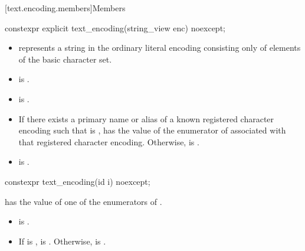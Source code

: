 [text.encoding.members]{Members}

%
\begin{itemdecl}
constexpr explicit text_encoding(string_view enc) noexcept;
\end{itemdecl}

\begin{itemdescr}
\pnum
\expects
\begin{itemize}
\item
{} represents a string in the ordinary literal encoding
consisting only of elements of the basic character set.
\item
{} is .
\item
{} is .
\end{itemize}

\pnum
\ensures
\begin{itemize}
\item
If there exists a primary name or alias 
of a known registered character encoding such that
 is ,
 has the value of the enumerator of 
associated with that registered character encoding.
Otherwise,  is .
\item
{} is .
\end{itemize}
\end{itemdescr}

%
\begin{itemdecl}
constexpr text_encoding(id i) noexcept;
\end{itemdecl}

\begin{itemdescr}
\pnum
\expects
{} has the value of one of the enumerators of .

\pnum
\ensures
\begin{itemize}
\item
{} is .
\item
If 
is ,
 is .
Otherwise,
is .
\end{itemize}
\end{itemdescr}

